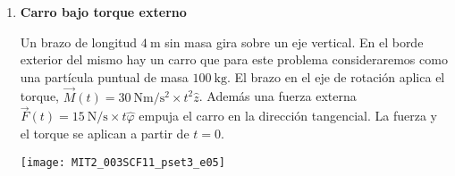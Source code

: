 \documentclass[11pt, spanish, a4paper, twoside]{article}
\begin{document}
\begin{enumerate}


\item
\textbf{Carro bajo torque externo}\\
\begin{minipage}[t][4cm]{0.5\textwidth}
Un brazo de longitud $\SI{4}{\metre}$ sin masa gira sobre un eje vertical.
En el borde exterior del mismo hay un carro que para este problema consideraremos como una partícula puntual de masa $\SI{100}{\kilo\gram}$.
El brazo en el eje de rotación aplica el torque, $\vec{M}(t)= \SI{30}{\newton\metre\per\second\squared} \times t^2 \hat{z}$.
Además una fuerza externa $\vec{F}(t)= \SI{15}{\newton\per\second} \times t \hat{\varphi}$ empuja el carro en la dirección tangencial.
La fuerza y el torque se aplican a partir de $t=0$.
\end{minipage}
\begin{minipage}[c][2cm][t]{0.45\textwidth}
	\texttt{[image: MIT2\_003SCF11\_pset3\_e05]}
\end{minipage}


\end{enumerate}
\end{document}
